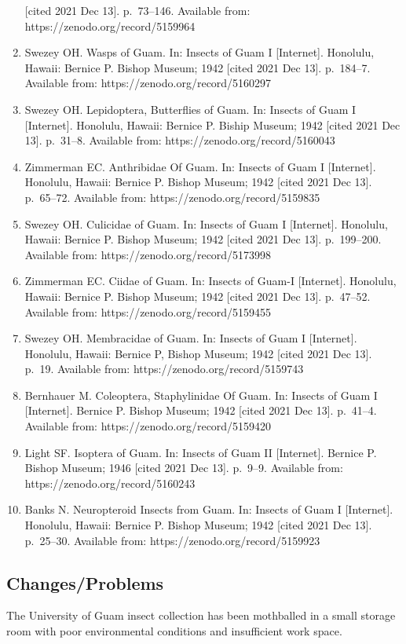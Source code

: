 \documentclass[
]{article}
\begin{document}
\begin{enumerate}
  {[}cited 2021 Dec 13{]}. p.~73--146. Available from:
  https://zenodo.org/record/5159964
\item
  Swezey OH. Wasps of Guam. In: Insects of Guam I {[}Internet{]}.
  Honolulu, Hawaii: Bernice P. Bishop Museum; 1942 {[}cited 2021 Dec
  13{]}. p.~184--7. Available from: https://zenodo.org/record/5160297
\item
  Swezey OH. Lepidoptera, Butterflies of Guam. In: Insects of Guam I
  {[}Internet{]}. Honolulu, Hawaii: Bernice P. Biship Museum; 1942
  {[}cited 2021 Dec 13{]}. p.~31--8. Available from:
  https://zenodo.org/record/5160043
\item
  Zimmerman EC. Anthribidae Of Guam. In: Insects of Guam I
  {[}Internet{]}. Honolulu, Hawaii: Bernice P. Bishop Museum; 1942
  {[}cited 2021 Dec 13{]}. p.~65--72. Available from:
  https://zenodo.org/record/5159835
\item
  Swezey OH. Culicidae of Guam. In: Insects of Guam I {[}Internet{]}.
  Honolulu, Hawaii: Bernice P. Bishop Museum; 1942 {[}cited 2021 Dec
  13{]}. p.~199--200. Available from: https://zenodo.org/record/5173998
\item
  Zimmerman EC. Ciidae of Guam. In: Insects of Guam-I {[}Internet{]}.
  Honolulu, Hawaii: Bernice P. Bishop Museum; 1942 {[}cited 2021 Dec
  13{]}. p.~47--52. Available from: https://zenodo.org/record/5159455
\item
  Swezey OH. Membracidae of Guam. In: Insects of Guam I {[}Internet{]}.
  Honolulu, Hawaii: Bernice P, Bishop Museum; 1942 {[}cited 2021 Dec
  13{]}. p.~19. Available from: https://zenodo.org/record/5159743
\item
  Bernhauer M. Coleoptera, Staphylinidae Of Guam. In: Insects of Guam I
  {[}Internet{]}. Bernice P. Bishop Museum; 1942 {[}cited 2021 Dec
  13{]}. p.~41--4. Available from: https://zenodo.org/record/5159420
\item
  Light SF. Isoptera of Guam. In: Insects of Guam II {[}Internet{]}.
  Bernice P. Bishop Museum; 1946 {[}cited 2021 Dec 13{]}. p.~9--9.
  Available from: https://zenodo.org/record/5160243
\item
  Banks N. Neuropteroid Insects from Guam. In: Insects of Guam I
  {[}Internet{]}. Honolulu, Hawaii: Bernice P. Bishop Museum; 1942
  {[}cited 2021 Dec 13{]}. p.~25--30. Available from:
  https://zenodo.org/record/5159923
\end{enumerate}

\hypertarget{changesproblems}{%
\subsection{Changes/Problems}\label{changesproblems}}

The University of Guam insect collection has been mothballed in a small
storage room with poor environmental conditions and insufficient work
space.
\end{document}
